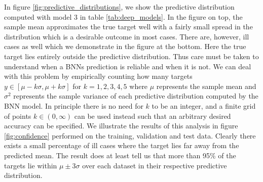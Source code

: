 In figure \ref{fig:predictive_distributions}, we show the predictive distribution computed with model 3 in table \ref{tab:deep_models}. In the figure on top, the sample mean approximates the true target well with a fairly small spread in the distribution which is a desirable outcome in most cases. There are, however, ill cases as well which we demonstrate in the figure at the bottom. Here the true target lies entirely outside the predictive distribution. Thus care must be taken to understand when a BNNs prediction is reliable and when it is not. We can deal with this problem by empirically counting how many targets $y \in [\mu - k\sigma, \mu + k \sigma]$ for $k = 1, 2, 3, 4, 5$ where $\mu$ represents the sample mean and $\sigma^2$ represents the sample variance of each predictive distribution computed by the BNN model. In principle there is no need for $k$ to be an integer, and a finite grid of points $k \in (0, \infty)$ can be used instead such that an arbitrary desired accuracy can be specified. We illustrate the results of this analysis in figure \ref{fig:confidence} performed on the training, validation and test data. Clearly there exists a small percentage of ill cases where the target lies far away from the predicted mean. The result does at least tell us that more than 95\% of the targets lie within $\mu \pm 3\sigma$ over each dataset in their respective predictive distribution.
